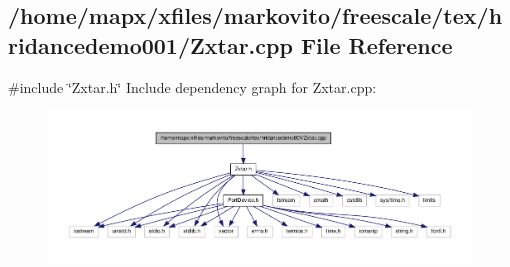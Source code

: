 \subsection{/home/mapx/xfiles/markovito/freescale/tex/hridancedemo001/\-Zxtar.cpp \-File \-Reference}
\label{_zxtar_8cpp}
{\ttfamily \#include \char`\"{}\-Zxtar.\-h\char`\"{}}\*
\-Include dependency graph for \-Zxtar.\-cpp\-:\nopagebreak
\begin{figure}[H]
\begin{center}
\leavevmode
\includegraphics[width=350pt]{_zxtar_8cpp__incl}
\end{center}
\end{figure}
